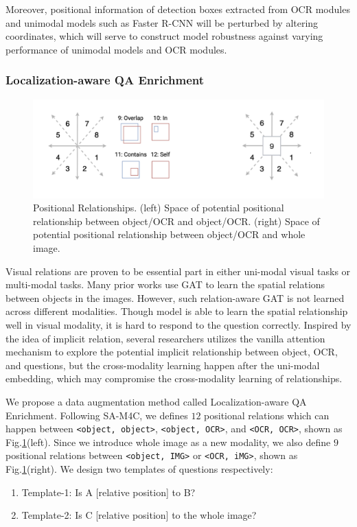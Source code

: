 \documentclass[11pt,a4paper]{article}
\begin{document}
Moreover, positional information of detection boxes extracted from OCR modules and unimodal models such as Faster R-CNN will be perturbed by altering coordinates, which will serve to construct model robustness against varying performance of unimodal models and OCR modules. 


\subsubsection{Localization-aware QA Enrichment}
\begin{figure}[h]
  \includegraphics[width=\linewidth]{figures/localization-aware.png}
  \caption{Positional Relationships. (left) Space of potential positional relationship between object/OCR and object/OCR. (right) Space of potential positional relationship between object/OCR and whole image.}
  \label{fig:localization}
\end{figure}
Visual relations are proven to be essential part in either uni-modal visual tasks or multi-modal tasks. Many prior works use GAT to learn the spatial relations between objects in the images. However, such relation-aware GAT is not learned across different modalities. Though model is able to learn the spatial relationship well in visual modality, it is hard to respond to the question correctly. Inspired by the idea of implicit relation, several researchers utilizes the vanilla attention mechanism to explore the potential implicit relationship between object, OCR, and questions, but the cross-modality learning happen after the uni-modal embedding, which may compromise the cross-modality learning of relationships.

We propose a data augmentation method called Localization-aware QA Enrichment. Following SA-M4C\cite{kant2020spatially}, we defines $12$ positional relations which can happen between \texttt{<object, object>}, \texttt{<object, OCR>}, and \texttt{<OCR, OCR>}, shown as Fig.\ref{fig:localization}(left). Since we introduce whole image as a new modality, we also define $9$ positional relations between \texttt{<object, IMG>} or \texttt{<OCR, iMG>}, shown as Fig.\ref{fig:localization}(right). We design two templates of questions respectively:
\begin{enumerate}
    \item Template-1: Is A [relative position] to B?
    \item Template-2: Is C [relative position] to the whole image?
\end{enumerate}
\end{document}
